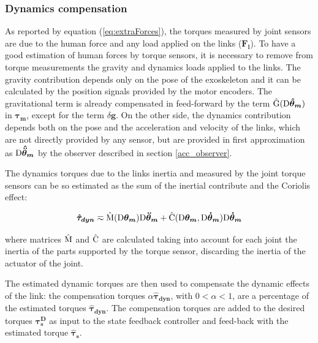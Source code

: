 \documentclass[journal]{IEEEtran}
\newcommand{\hl}[1]{\colorbox{yellow}{#1}}
\newcommand{\vectm}[1]{ { {\text #1} }}
\newcommand{\vects}[1]{{\boldsymbol {#1}}}
\begin{document}

\subsubsection{Dynamics compensation} \label{Dynamics compensation}

As reported by equation (\ref{eq:extraForces}), the torques measured by joint sensors are due to the human force and any load applied on the links ($\vects{F_l}$). To have a good estimation of human forces by torque sensors, it is necessary to remove from torque measurements the gravity and dynamics loads applied to the links. The gravity contribution  depends only on the pose of the exoskeleton and it can be calculated by the position signals provided by the motor encoders. The gravitational term is already compensated in feed-forward by the term $\hat{\vectm{G}}(\vectm{D}\vects{\hat{\theta}_m})$ in $\vects{\tau_{m}}$,
except for the term $\delta \vects{g}$.
On the other side, the dynamics contribution depends both on the pose and the acceleration and velocity of the links, which are not directly provided by any sensor, but are provided in first approximation as $\vectm{D} \vects{\hat{\ddot{\theta}}_m}$  by the observer described in section \ref{acc_observer}.

The dynamics torques due to the links inertia and measured by the joint torque sensors can be so estimated as the sum of the inertial contribute and the Coriolis effect:

\begin{equation}
\vects{\hat{\tau}_{dyn}}  \eqsim \hat{\vectm{M}}(\vectm{D} \vects{\theta_m}) \vectm{D} \vects{\ddot{\theta}_m}+\hat{\vectm{C}}(\vectm{D} \vects{\theta_m},\vectm{D} \vects{\dot{\theta}_m})\vectm{D} \vects{\dot{\theta}_m}
\end{equation}

where matrices $\hat{\vectm{M}}$ and $\hat{\vectm{C}}$ are calculated taking into account for each joint the inertia of the parts supported by the torque sensor, discarding the inertia of the actuator of the joint.

The estimated dynamic torques are then used to compensate the dynamic effects of the link: the compensation torques $\alpha \vects{\hat{\tau}_{dyn}}$, with $0<\alpha<1$, are a percentage of the estimated torques $\vects{\hat{\tau}_{dyn}}$. The compensation torques are added to the desired torques $\vects{\tau_s^D}$ as input to the state feedback controller and feed-back with the estimated torque $\vects{\hat{\tau}_s}$. 
\end{document}
